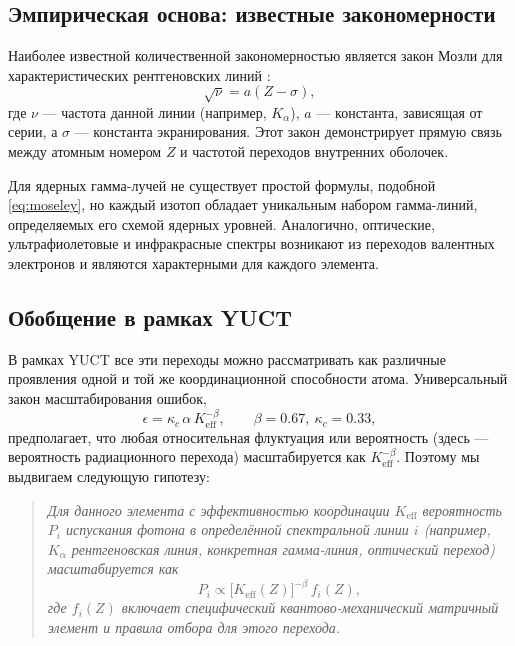 \documentclass[12pt,a4paper]{article}
\theoremstyle{remark}
\begin{document}
	\subsection{Эмпирическая основа: известные закономерности}
	
	Наиболее известной количественной закономерностью является закон Мозли для характеристических рентгеновских линий \cite{Moseley1913}:
	\begin{equation}
		\sqrt{\nu} = a (Z - \sigma),
		\label{eq:moseley}
	\end{equation}
	где \(\nu\) — частота данной линии (например, \(K_\alpha\)), \(a\) — константа, зависящая от серии, а \(\sigma\) — константа экранирования. Этот закон демонстрирует прямую связь между атомным номером \(Z\) и частотой переходов внутренних оболочек.
	
	Для ядерных гамма-лучей не существует простой формулы, подобной \eqref{eq:moseley}, но каждый изотоп обладает уникальным набором гамма-линий, определяемых его схемой ядерных уровней. Аналогично, оптические, ультрафиолетовые и инфракрасные спектры возникают из переходов валентных электронов и являются характерными для каждого элемента.
	
	\subsection{Обобщение в рамках YUCT}
	
	В рамках YUCT все эти переходы можно рассматривать как различные проявления одной и той же координационной способности атома. Универсальный закон масштабирования ошибок,
	\begin{equation}
		\epsilon = \kappa_c \, \alpha \, K_{\mathrm{eff}}^{-\beta}, \qquad \beta = 0.67,\ \kappa_c = 0.33,
		\label{eq:universal_law}
	\end{equation}
	предполагает, что любая относительная флуктуация или вероятность (здесь — вероятность радиационного перехода) масштабируется как \(K_{\mathrm{eff}}^{-\beta}\). Поэтому мы выдвигаем следующую гипотезу:
	
	\begin{quote}
		\emph{Для данного элемента с эффективностью координации \(K_{\mathrm{eff}}\) вероятность \(P_i\) испускания фотона в определённой спектральной линии \(i\) (например, \(K_\alpha\) рентгеновская линия, конкретная гамма-линия, оптический переход) масштабируется как}
		\begin{equation}
			P_i \propto \bigl[K_{\mathrm{eff}}(Z)\bigr]^{-\beta} \, f_i(Z),
			\label{eq:prob_scaling}
		\end{equation}
		\emph{где \(f_i(Z)\) включает специфический квантово-механический матричный элемент и правила отбора для этого перехода.}
	\end{quote}
	
\end{document}
